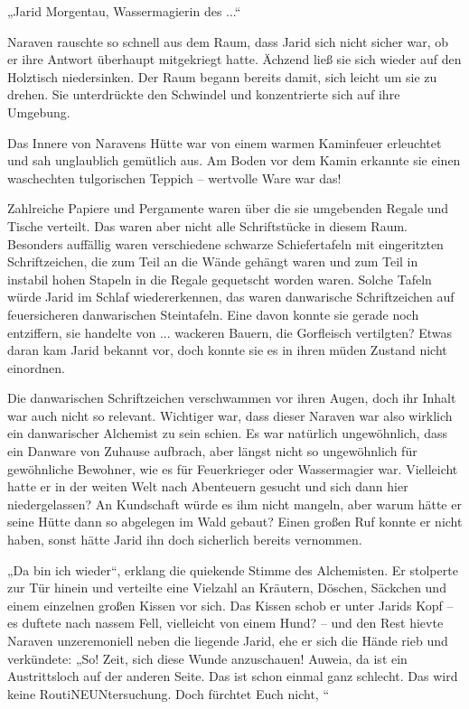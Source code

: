 „Jarid Morgentau, Wassermagierin des ...“

Naraven rauschte so schnell aus dem Raum, dass Jarid sich nicht sicher war, ob er ihre Antwort überhaupt mitgekriegt hatte. Ächzend ließ sie sich wieder auf den Holztisch niedersinken. Der Raum begann bereits damit, sich leicht um sie zu drehen. Sie unterdrückte den Schwindel und konzentrierte sich auf ihre Umgebung.

Das Innere von Naravens Hütte war von einem warmen Kaminfeuer erleuchtet und sah unglaublich gemütlich aus. Am Boden vor dem Kamin erkannte sie einen waschechten tulgorischen Teppich – wertvolle Ware war das!

Zahlreiche Papiere und Pergamente waren über die sie umgebenden Regale und Tische verteilt. Das waren aber nicht alle Schriftstücke in diesem Raum. Besonders auffällig waren verschiedene schwarze Schiefertafeln mit eingeritzten Schriftzeichen, die zum Teil an die Wände gehängt waren und zum Teil in instabil hohen Stapeln in die Regale gequetscht worden waren. Solche Tafeln würde Jarid im Schlaf wiedererkennen, das waren danwarische Schriftzeichen auf feuersicheren danwarischen Steintafeln. Eine davon konnte sie gerade noch entziffern, sie handelte von ... wackeren Bauern, die Gorfleisch vertilgten? Etwas daran kam Jarid bekannt vor, doch konnte sie es in ihren müden Zustand nicht einordnen.

Die danwarischen Schriftzeichen verschwammen vor ihren Augen, doch ihr Inhalt war auch nicht so relevant. Wichtiger war, dass dieser Naraven war also wirklich ein danwarischer Alchemist zu sein schien. Es war natürlich ungewöhnlich, dass ein Danware von Zuhause aufbrach, aber längst nicht so ungewöhnlich für gewöhnliche Bewohner, wie es für Feuerkrieger oder Wassermagier war. Vielleicht hatte er in der weiten Welt nach Abenteuern gesucht und sich dann hier niedergelassen? An Kundschaft würde es ihm nicht mangeln, aber warum hätte er seine Hütte dann so abgelegen im Wald gebaut? Einen großen Ruf konnte er nicht haben, sonst hätte Jarid ihn doch sicherlich bereits vernommen.

„Da bin ich wieder“, erklang die quiekende Stimme des Alchemisten. Er stolperte zur Tür hinein und verteilte eine Vielzahl an Kräutern, Döschen, Säckchen und einem einzelnen großen Kissen vor sich. Das Kissen schob er unter Jarids Kopf – es duftete nach nassem Fell, vielleicht von einem Hund? – und den Rest hievte Naraven unzeremoniell neben die liegende Jarid, ehe er sich die Hände rieb und verkündete: „So! Zeit, sich diese Wunde anzuschauen! Auweia, da ist ein Austrittsloch auf der anderen Seite. Das ist schon einmal ganz schlecht. Das wird keine RoutiNEUNtersuchung. Doch fürchtet Euch nicht, “


